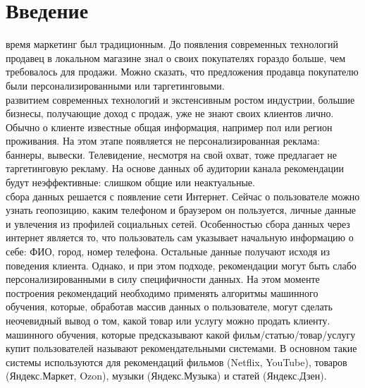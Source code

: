 \documentclass{article}
\newcommand\tab[1][1cm]{\hspace*{#1}}
\begin{document}
\newpage
	
\renewcommand*\contentsname{Содержание}
\makeatletter
\renewcommand{\l@section}{\@dottedtocline{1}{0em}{2em}}
\renewcommand{\l@subsection}{\@dottedtocline{1}{0em}{2.6em}}
\renewcommand{\l@subsubsection}{\@dottedtocline{1}{0em}{3.2em}}

\makeatother
\setcounter{page}{2}

\begin{center}
	\tableofcontents
\end{center}

\newpage
\section{Введение}
 время маркетинг был традиционным. До появления современных технологий продавец в локальном магазине знал о своих покупателях гораздо больше, чем требовалось для продажи. Можно сказать, что предложения продавца покупателю были персонализированными или таргетинговыми. \\
 развитием современных технологий и экстенсивным ростом индустрии, большие бизнесы, получающие доход с продаж, уже не знают своих клиентов лично. Обычно о клиенте известные общая информация, например пол или регион проживания. На этом этапе появляется не персонализированная реклама: баннеры, вывески. Телевидение, несмотря на свой охват, тоже предлагает не таргетинговую рекламу. На основе данных об аудитории канала рекомендации будут неэффективные: слишком общие или неактуальные. \\
 сбора данных решается с появление сети Интернет. Сейчас о пользователе можно узнать геопозицию, каким телефоном и браузером он пользуется, личные данные и увлечения из профилей социальных сетей. Особенностью сбора данных через интернет является то, что пользователь сам указывает начальную информацию о себе: ФИО, город, номер телефона. Остальные данные получают исходя из поведения клиента. 
Однако, и при этом подходе, рекомендации могут быть слабо персонализированными в силу специфичности данных. На этом моменте построения рекомендаций необходимо применять алгоритмы машинного обучения, которые, обработав массив данных о пользователе, могут сделать неочевидный вывод о том, какой товар или услугу можно продать клиенту.\\
 машинного обучения, которые предсказывают какой фильм/статью/товар/услугу купит пользователей называют рекомендательными системами. В основном такие системы используются для рекомендаций фильмов (Netflix, YouTube), товаров (Яндекс.Маркет, Ozon), музыки (Яндекс.Музыка) и статей (Яндекс.Дзен). \\
\end{document}
